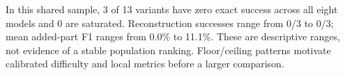 In this shared sample, 3 of 13 variants have zero exact success across all eight models and 0 are saturated.
Reconstruction successes range from 0/3 to 0/3;
mean added-part F1 ranges from 0.0\% to 11.1\%.
These are descriptive ranges, not evidence of a stable population ranking. Floor/ceiling patterns motivate calibrated difficulty and local metrics before a larger comparison.
